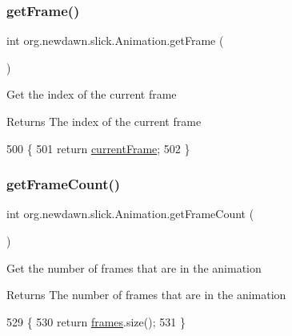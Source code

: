 \subsubsection{\texorpdfstring{get\+Frame()}{getFrame()}}
{\footnotesize\ttfamily int org.\+newdawn.\+slick.\+Animation.\+get\+Frame (\begin{DoxyParamCaption}{ }\end{DoxyParamCaption})\hspace{0.3cm}{\ttfamily [inline]}}

Get the index of the current frame

\begin{DoxyReturn}{Returns}
The index of the current frame 
\end{DoxyReturn}

\begin{DoxyCode}
500                           \{
501         \textcolor{keywordflow}{return} \mbox{\hyperlink{classorg_1_1newdawn_1_1slick_1_1_animation_a358e1f2b9d9a05f83a416405e6bcd332}{currentFrame}};
502     \}
\end{DoxyCode}
\mbox{\label{classorg_1_1newdawn_1_1slick_1_1_animation_a5f639b2ad6f39b7a99949bc48e54c827}} 
\subsubsection{\texorpdfstring{get\+Frame\+Count()}{getFrameCount()}}
{\footnotesize\ttfamily int org.\+newdawn.\+slick.\+Animation.\+get\+Frame\+Count (\begin{DoxyParamCaption}{ }\end{DoxyParamCaption})\hspace{0.3cm}{\ttfamily [inline]}}

Get the number of frames that are in the animation

\begin{DoxyReturn}{Returns}
The number of frames that are in the animation 
\end{DoxyReturn}

\begin{DoxyCode}
529                                \{
530         \textcolor{keywordflow}{return} \mbox{\hyperlink{classorg_1_1newdawn_1_1slick_1_1_animation_a39f0c6a16e479985b22f7dd3bb781bf7}{frames}}.size();
531     \}
\end{DoxyCode}
\mbox{\label{classorg_1_1newdawn_1_1slick_1_1_animation_aff46e9d56b098ef31409d2b017538dad}} 
